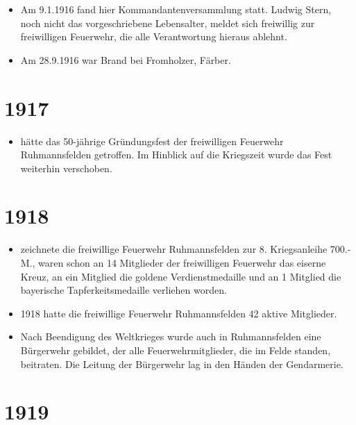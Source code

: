 \documentclass[12pt,a4paper]{book}
\begin{document}
\begin{itemize}
\item Am 9.1.1916 fand hier Kommandantenversammlung statt. Ludwig Stern, noch
nicht das vorgeschriebene Lebensalter, meldet sich freiwillig zur freiwilligen
Feuerwehr, die alle Verantwortung hieraus ablehnt.

\item Am 28.9.1916 war Brand bei Fromholzer, Färber.
\end{itemize}

\section*{1917}

\begin{itemize}
\item hätte das 50-jährige Gründungsfest der freiwilligen Feuerwehr
Ruhmannsfelden getroffen. Im Hinblick auf die Kriegszeit wurde das Fest
weiterhin verschoben.
\end{itemize}

\section*{1918}

\begin{itemize}
\item zeichnete die freiwillige Feuerwehr Ruhmannsfelden zur 8. Kriegsanleihe
700.- M., waren schon an 14 Mitglieder der freiwilligen Feuerwehr das eiserne
Kreuz, an ein Mitglied die goldene Verdienstmedaille und an 1 Mitglied die
bayerische Tapferkeitsmedaille verliehen worden.

\item 1918 hatte die freiwillige Feuerwehr Ruhmannsfelden 42 aktive Mitglieder.

\item Nach Beendigung des Weltkrieges wurde auch in Ruhmannsfelden eine
Bürgerwehr gebildet, der alle Feuerwehrmitglieder, die im Felde standen,
beitraten. Die Leitung der Bürgerwehr lag in den Händen der Gendarmerie.
\end{itemize}

\section*{1919}
\end{document}
